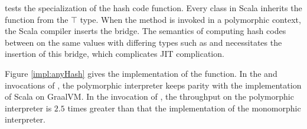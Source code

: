  tests the specialization of the hash code function.
Every class in Scala inherits the  function from the $\top$ type.
When the  method is invoked in a polymorphic context, the Scala compiler inserts the  bridge.
The semantics of computing hash codes between on the same values with differing types such as  and  necessitates the insertion of this bridge, which complicates JIT complication.

Figure \ref{impl:anyHash} gives the implementation of the  function.
In the  and  invocations of , the polymorphic interpreter keeps parity with the implementation of Scala on GraalVM.
In the  invocation of , the throughput on the polymorphic interpreter is $2.5$ times greater than that the implementation of the monomorphic interpreter.





